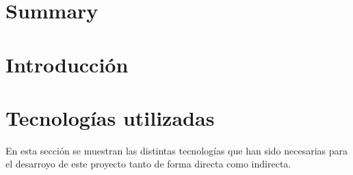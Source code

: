 \documentclass[a4paper, 12pt]{book}
\begin{document}

\chapter*{Summary}



\tableofcontents
\cleardoublepage
\listoffigures %



\cleardoublepage
\chapter{Introducción}
\label{sec:intro} %





\cleardoublepage %
\chapter{Tecnologías utilizadas} %
\label{chap:objetivos} %
En esta sección se muestran las distintas tecnologías que han sido necesarias para el desarroyo de este proyecto tanto de forma directa como indirecta.
\end{document}

